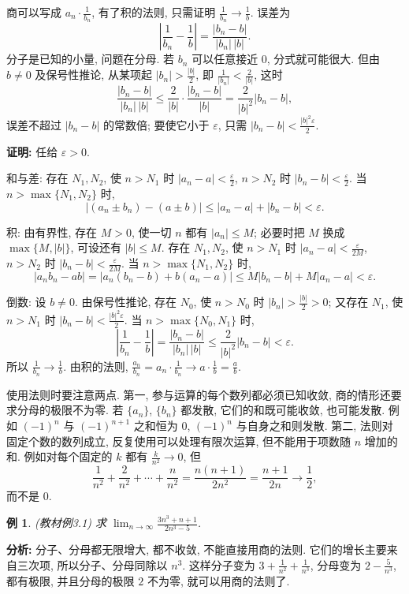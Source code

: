 \documentclass[UTF8,openany]{ctexbook}
\theoremstyle{chinesetextbook}
\newtheorem{example}{例}[section]
\newenvironment{cnproof}{\par\indent\textbf{证明:} \ignorespaces}{\par}
\begin{document}
商可以写成 $\displaystyle a_n\cdot\frac1{b_n}$, 有了积的法则, 只需证明 $\displaystyle\frac1{b_n}\to\frac1b$. 误差为
\[
\left|\frac1{b_n}-\frac1b\right|=\frac{|b_n-b|}{|b_n|\,|b|}.
\]
分子是已知的小量, 问题在分母. 若 $b_n$ 可以任意接近 $0$, 分式就可能很大. 但由 $b\ne0$ 及保号性推论, 从某项起 $\displaystyle|b_n|>\frac{|b|}2$, 即 $\displaystyle\frac1{|b_n|}<\frac2{|b|}$, 这时
\[
\frac{|b_n-b|}{|b_n|\,|b|}\le\frac2{|b|}\cdot\frac{|b_n-b|}{|b|}=\frac2{|b|^2}|b_n-b|,
\]
误差不超过 $|b_n-b|$ 的常数倍; 要使它小于 $\varepsilon$, 只需 $\displaystyle|b_n-b|<\frac{|b|^2\varepsilon}2$.
\begin{cnproof}
任给 $\varepsilon>0$.

和与差: 存在 $N_1,N_2$, 使 $n>N_1$ 时 $\displaystyle|a_n-a|<\frac\varepsilon2$, $n>N_2$ 时 $\displaystyle|b_n-b|<\frac\varepsilon2$. 当 $n>\max\{N_1,N_2\}$ 时,
\[
|(a_n\pm b_n)-(a\pm b)|\le|a_n-a|+|b_n-b|<\varepsilon.
\]

积: 由有界性, 存在 $M>0$, 使一切 $n$ 都有 $|a_n|\le M$; 必要时把 $M$ 换成 $\max\{M,|b|\}$, 可设还有 $|b|\le M$. 存在 $N_1,N_2$, 使 $n>N_1$ 时 $\displaystyle|a_n-a|<\frac\varepsilon{2M}$, $n>N_2$ 时 $\displaystyle|b_n-b|<\frac\varepsilon{2M}$. 当 $n>\max\{N_1,N_2\}$ 时,
\[
|a_nb_n-ab|=|a_n(b_n-b)+b(a_n-a)|\le M|b_n-b|+M|a_n-a|<\varepsilon.
\]

倒数: 设 $b\ne0$. 由保号性推论, 存在 $N_0$, 使 $n>N_0$ 时 $\displaystyle|b_n|>\frac{|b|}2>0$; 又存在 $N_1$, 使 $n>N_1$ 时 $\displaystyle|b_n-b|<\frac{|b|^2\varepsilon}2$. 当 $n>\max\{N_0,N_1\}$ 时,
\[
\left|\frac1{b_n}-\frac1b\right|=\frac{|b_n-b|}{|b_n|\,|b|}\le\frac2{|b|^2}|b_n-b|<\varepsilon.
\]
所以 $\displaystyle\frac1{b_n}\to\frac1b$. 由积的法则, $\displaystyle\frac{a_n}{b_n}=a_n\cdot\frac1{b_n}\to a\cdot\frac1b=\frac ab$.
\end{cnproof}
使用法则时要注意两点. 第一, 参与运算的每个数列都必须已知收敛, 商的情形还要求分母的极限不为零. 若 $\{a_n\}$, $\{b_n\}$ 都发散, 它们的和既可能收敛, 也可能发散. 例如 $(-1)^n$ 与 $(-1)^{n+1}$ 之和恒为 $0$, $(-1)^n$ 与自身之和则发散. 第二, 法则对固定个数的数列成立, 反复使用可以处理有限次运算, 但不能用于项数随 $n$ 增加的和. 例如对每个固定的 $k$ 都有 $\displaystyle\frac k{n^2}\to0$, 但
\[
\frac1{n^2}+\frac2{n^2}+\cdots+\frac n{n^2}=\frac{n(n+1)}{2n^2}=\frac{n+1}{2n}\to\frac12,
\]
而不是 $0$.
\begin{example}
\textnormal{(教材例3.1)} 求 $\displaystyle\lim_{n\to\infty}\frac{3n^3+n+1}{2n^3-5}$.
\end{example}
\par\indent\textbf{分析:} 分子、分母都无限增大, 都不收敛, 不能直接用商的法则. 它们的增长主要来自三次项, 所以分子、分母同除以 $n^3$. 这样分子变为 $\displaystyle3+\frac1{n^2}+\frac1{n^3}$, 分母变为 $\displaystyle2-\frac5{n^3}$, 都有极限, 并且分母的极限 $2$ 不为零, 就可以用商的法则了.
\end{document}
